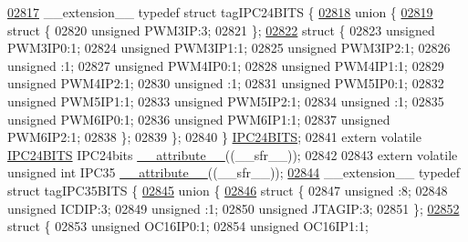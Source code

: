 \begin{DoxyCode}
\hypertarget{a00009_source_l02817}{}\hyperlink{a00008}{02817} \_\_extension\_\_ \textcolor{keyword}{typedef} \textcolor{keyword}{struct }tagIPC24BITS \{
\hypertarget{a00009_source_l02818}{}\hyperlink{a00009}{02818}   \textcolor{keyword}{union }\{
\hypertarget{a00009_source_l02819}{}\hyperlink{a00009}{02819}     \textcolor{keyword}{struct }\{
02820       \textcolor{keywordtype}{unsigned} PWM3IP:3;
02821     \};
\hypertarget{a00009_source_l02822}{}\hyperlink{a00009}{02822}     \textcolor{keyword}{struct }\{
02823       \textcolor{keywordtype}{unsigned} PWM3IP0:1;
02824       \textcolor{keywordtype}{unsigned} PWM3IP1:1;
02825       \textcolor{keywordtype}{unsigned} PWM3IP2:1;
02826       \textcolor{keywordtype}{unsigned} :1;
02827       \textcolor{keywordtype}{unsigned} PWM4IP0:1;
02828       \textcolor{keywordtype}{unsigned} PWM4IP1:1;
02829       \textcolor{keywordtype}{unsigned} PWM4IP2:1;
02830       \textcolor{keywordtype}{unsigned} :1;
02831       \textcolor{keywordtype}{unsigned} PWM5IP0:1;
02832       \textcolor{keywordtype}{unsigned} PWM5IP1:1;
02833       \textcolor{keywordtype}{unsigned} PWM5IP2:1;
02834       \textcolor{keywordtype}{unsigned} :1;
02835       \textcolor{keywordtype}{unsigned} PWM6IP0:1;
02836       \textcolor{keywordtype}{unsigned} PWM6IP1:1;
02837       \textcolor{keywordtype}{unsigned} PWM6IP2:1;
02838     \};
02839   \};
02840 \} \hyperlink{a00008_d7/d84/a00535}{IPC24BITS};
02841 \textcolor{keyword}{extern} \textcolor{keyword}{volatile} \hyperlink{a00008_d7/d84/a00535}{IPC24BITS} IPC24bits \hyperlink{a00009_a493c46f03454991ccc5aa7a6e1dfb2a7}{\_\_attribute\_\_}((\_\_sfr\_\_));
02842 
02843 \textcolor{keyword}{extern} \textcolor{keyword}{volatile} \textcolor{keywordtype}{unsigned} \textcolor{keywordtype}{int}  IPC35 \hyperlink{a00009_a493c46f03454991ccc5aa7a6e1dfb2a7}{\_\_attribute\_\_}((\_\_sfr\_\_));
\hypertarget{a00009_source_l02844}{}\hyperlink{a00008}{02844} \_\_extension\_\_ \textcolor{keyword}{typedef} \textcolor{keyword}{struct }tagIPC35BITS \{
\hypertarget{a00009_source_l02845}{}\hyperlink{a00009}{02845}   \textcolor{keyword}{union }\{
\hypertarget{a00009_source_l02846}{}\hyperlink{a00009}{02846}     \textcolor{keyword}{struct }\{
02847       \textcolor{keywordtype}{unsigned} :8;
02848       \textcolor{keywordtype}{unsigned} ICDIP:3;
02849       \textcolor{keywordtype}{unsigned} :1;
02850       \textcolor{keywordtype}{unsigned} JTAGIP:3;
02851     \};
\hypertarget{a00009_source_l02852}{}\hyperlink{a00009}{02852}     \textcolor{keyword}{struct }\{
02853       \textcolor{keywordtype}{unsigned} OC16IP0:1;
02854       \textcolor{keywordtype}{unsigned} OC16IP1:1;

\end{DoxyCode}
